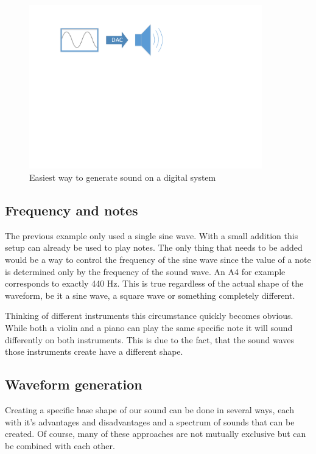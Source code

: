	  	\begin{figure}[!h]
		\centering
			\includegraphics[width=0.90\textwidth]{images/sound_generation.pdf}
		\caption{Easiest way to generate sound on a digital system}
		\label{fig:sound_generation}
		\end{figure}
		
		\subsection{Frequency and notes}
		The previous example only used a single sine wave. 
		With a small addition this setup can already be used to play notes.
		The only thing that needs to be added would be a way to control the frequency of the sine wave since the value of a note is determined only by the frequency of the sound wave. 
		An A4 for example corresponds to exactly 440 Hz.
		This is true regardless of the actual shape of the waveform, be it a sine wave, a square wave or something completely different. 

		Thinking of different instruments this circumstance quickly becomes obvious. 
		While both a violin and a piano can play the same specific note it will sound differently on both instruments.
		This is due to the fact, that the sound waves those instruments create have a different shape.
		
		\subsection{Waveform generation}
		Creating a specific base shape of our sound can be done in several ways, each with it's advantages and disadvantages and a spectrum of sounds that can be created.
		Of course, many of these approaches are not mutually exclusive but can be combined with each other.

